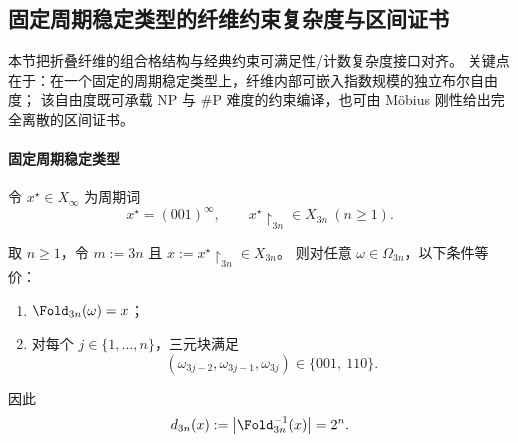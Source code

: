 \subsection{固定周期稳定类型的纤维约束复杂度与区间证书}\label{subsec:conclusion-periodic-fiber-cnf-complexity}
本节把折叠纤维的组合格结构与经典约束可满足性/计数复杂度接口对齐。
关键点在于：在一个固定的周期稳定类型上，纤维内部可嵌入指数规模的独立布尔自由度；
该自由度既可承载 \(\mathrm{NP}\) 与 \(\#\mathrm{P}\) 难度的约束编译，也可由 Möbius 刚性给出完全离散的区间证书。



\paragraph{固定周期稳定类型}
令 \(x^\star\in X_\infty\) 为周期词
\[
x^\star=(001)^\infty,
\qquad
x^\star\!\upharpoonright_{3n}\in X_{3n}\ (n\ge 1).
\]

\begin{theorem}[周期三稳定类型的纤维完全刻画与精确多重度]\label{thm:conclusion-period3-fiber-exact-multiplicity}
取 \(n\ge 1\)，令 \(m:=3n\) 且 \(x:=x^\star\!\upharpoonright_{3n}\in X_{3n}\)。
则对任意 \(\omega\in\Omega_{3n}\)，以下条件等价：
\begin{enumerate}
  \item \(\Fold_{3n}(\omega)=x\)；
  \item 对每个 \(j\in\{1,\dots,n\}\)，三元块满足
  \[
  (\omega_{3j-2},\omega_{3j-1},\omega_{3j})\in\{001,\ 110\}.
  \]
\end{enumerate}
因此
\[
d_{3n}(x):=\bigl|\Fold_{3n}^{-1}(x)\bigr|=2^n.
\]
\end{theorem}

